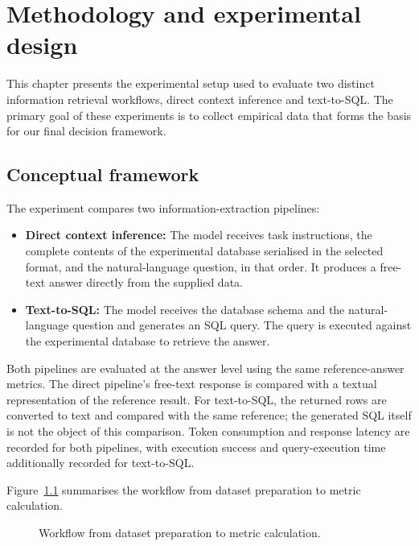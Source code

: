 \chapter{Methodology and experimental design} \label{ch:methodolgy}

This chapter presents the experimental setup used to evaluate two distinct information retrieval workflows,
direct context inference and text-to-SQL. The primary goal of these experiments is to collect empirical data
that forms the basis for our final decision framework.

\section{Conceptual framework} \label{sec:pipeline-comparison}

The experiment compares two information-extraction pipelines:

\begin{itemize}
  \item \textbf{Direct context inference:} The model receives task instructions, the complete contents of the
    experimental database serialised in the selected format, and the natural-language question, in that
    order. It produces a free-text answer directly from the supplied data.
  \item \textbf{Text-to-SQL:} The model receives the database schema and the natural-language question and
    generates an SQL query. The query is executed against the experimental database to retrieve the answer.
\end{itemize}

Both pipelines are evaluated at the answer level using the same reference-answer metrics. The direct
pipeline's free-text response is compared with a textual representation of the reference result. For
text-to-SQL, the returned rows are converted to text and compared with the same reference; the generated SQL
itself is not the object of this comparison. Token consumption and response latency are recorded for both
pipelines, with execution success and query-execution time additionally recorded for text-to-SQL.

Figure~\ref{fig:experimental-workflow} summarises the workflow from dataset preparation to metric calculation.

\begin{figure}[htbp]   \centering   \resizebox{\textwidth}{!}{}
  \caption{Workflow from dataset preparation to metric calculation.}   \label{fig:experimental-workflow}
\end{figure}

